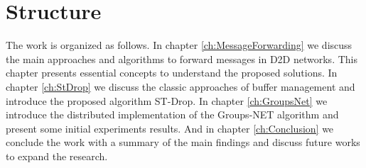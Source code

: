\section{Structure}
\label{sec:intro.structure}
The work is organized as follows. In chapter \ref{ch:MessageForwarding} we discuss the main approaches and algorithms to forward messages in D2D networks. This chapter presents essential concepts to understand the proposed solutions. In chapter \ref{ch:StDrop} we discuss the classic approaches of buffer management and introduce the proposed algorithm ST-Drop. In chapter \ref{ch:GroupsNet} we introduce the distributed implementation of the Groups-NET algorithm and present some initial experiments results. And in chapter \ref{ch:Conclusion} we conclude the work with a summary of the main findings and discuss future works to expand the research.
